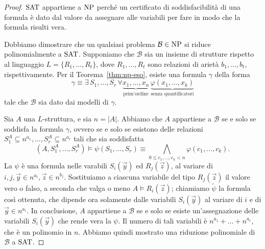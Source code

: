 \begin{proof}
  $\operatorname{SAT}$ appartiene a $\operatorname{NP}$ perché un certificato di soddisfacibilità di una formula è dato dal valore da assegnare alle variabili per fare in modo che la formula risulti vera.
  
  Dobbiamo dimostrare che un qualsiasi problema $\mathcal{B}\in\operatorname{NP}$ si riduce polinomialmente a $\operatorname{SAT}$.
  Supponiamo che $\mathcal{B}$ sia un insieme di strutture rispetto al linguaggio $L=\{R_1,\dots,R_t\}$, dove $R_1,\dots,R_t$ sono relazioni di arietà $b_1,\dots,b_t$, rispettivamente.
  Per il Teorema~\ref{thm:np-eso}, esiste una formula $\gamma$ della forma
  \[ \gamma \equiv \exists\, S_1,\dots,S_r \, \forall \underbrace{x_1,\dots,x_n}_{\text{prim'ordine}} \, \underbrace{\varphi(x_1,\dots,x_k)}_{\text{senza quantificatori}} \]
  tale che $\mathcal{B}$ sia dato dai modelli di $\gamma$.
  
  Sia $A$ una $L$-struttura, e sia $n=|A|$. Abbiamo che $A$ appartiene a $\mathcal{B}$ se e solo se soddisfa la formula $\gamma$, ovvero se e solo se esistono delle relazioni $S_1^A\subseteq n^{a_1}, \dots, S_r^A\subseteq n^{a_r}$ tali che sia soddisfatta
  \[ (A, S_1^A, \ldots,S_r^A) \models \psi(S_1,\ldots,S_r) \equiv \bigwedge_{0\leq c_1,\dots,c_k < n} \varphi(c_1,\dots,c_k). \]
  La $\psi$ è una formula nelle varabili $S_i(\vec{y})$ ed $R_j(\vec{z})$, al variare di $i,j,\vec{y}\in n^{a_i}, \vec{z}\in n^{b_j}$.
  Sostituiamo a ciascuna variabile del tipo $R_j(\vec{z})$ il valore vero o falso, a seconda che valga o meno $A \models R_i(\vec{z})$; chiamiamo $\tilde\psi$ la formula così ottenuta, che dipende ora solamente dalle variabili $S_i(\vec{y})$ al variare di $i$ e di $\vec{y}\in n^{a_i}$.
  In conclusione, $A$ appartiene a $\mathcal{B}$ se e solo se esiste un'assegnazione delle variabili $S_i(\vec{y})$ che rende vera la $\psi$. Il numero di tali variabili è $n^{a_1}+\ldots+n^{a_r}$, che è un polinomio in $n$.
  Abbiamo quindi mostrato una riduzione polinomiale di $\mathcal{B}$ a $\operatorname{SAT}$.
\end{proof}




